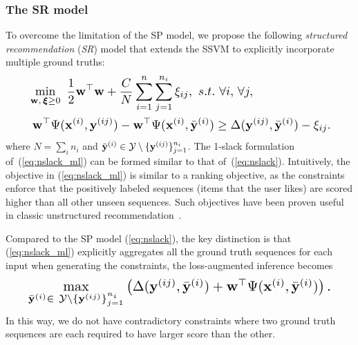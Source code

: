 \subsubsection{The SR model}
To overcome the limitation of the SP model,
we propose the following \emph{structured recommendation} (\emph{SR}) model that extends the SSVM to explicitly incorporate multiple ground truths: %
\begin{equation}
\label{eq:nslack_ml}
\resizebox{0.909\linewidth}{!}{$
\begin{aligned}
& \min_{\w, \, \bm{\xi} \ge 0} \ \frac{1}{2} \w^\top \w + \frac{C}{N} \sum_{i=1}^n \sum_{j=1}^{n_i} \xi_{ij},
\ s.t. \ \forall i, \, \forall j, \\
& \ \w^\top \Psi(\x^{(i)}, \y^{(ij)}) - \w^\top \Psi(\x^{(i)}, \bar{\y}^{(i)}) \ge
  \Delta(\y^{(ij)}, \bar{\y}^{(i)}) - \xi_{ij}.
\end{aligned}
$}
\end{equation}
where $N = \sum_i n_i$ and $\bar{\mathbf{y}}^{(i)} \in \mathcal{Y} \setminus \{\mathbf{y}^{(ij)}\}_{j=1}^{n_i}$.
The 1-slack formulation of~(\ref{eq:nslack_ml}) can be formed similar to that of~(\ref{eq:nslack}).
Intuitively, the objective in (\ref{eq:nslack_ml}) is similar to a ranking objective, as the constraints enforce
that the positively labeled sequences 
(items that the user likes) 
are scored higher than all other unseen sequences.
Such objectives have been proven useful in classic unstructured recommendation~\cite{bpr09}.

Compared to the SP model (\ref{eq:nslack}), the key distinction is that (\ref{eq:nslack_ml})
explicitly aggregates all the ground truth sequences for each input when generating the constraints,
\ie the loss-augmented inference becomes
\begin{equation}
\label{eq:loss_aug_inf}
\resizebox{0.909\linewidth}{!}{$
\underset{\bar{\y}^{(i)} \in \ \mathcal{Y} \setminus \{\y^{(ij)}\}_{j=1}^{n_i}}{\max}
     \left( \Delta(\y^{(ij)}, \bar{\y}^{(i)}) + \w^\top \Psi(\x^{(i)}, \bar\y^{(i)}) \right).
$}
\end{equation}
In this way, we do not have contradictory constraints where
two ground truth sequences are each required to have larger score than the other.

